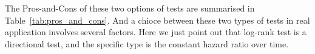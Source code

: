 \documentclass[a4paper,12pt]{article}
\begin{document}
The Pros-and-Cons of these two options of tests are summarised in Table~\ref{tab:pros_and_cons}. And a chioce between these two types of tests in real application involves several factors. Here we just point out that log-rank test is a directional test, and the specific type is the {\color{red} constant hazard ratio over time}.



\end{document}
